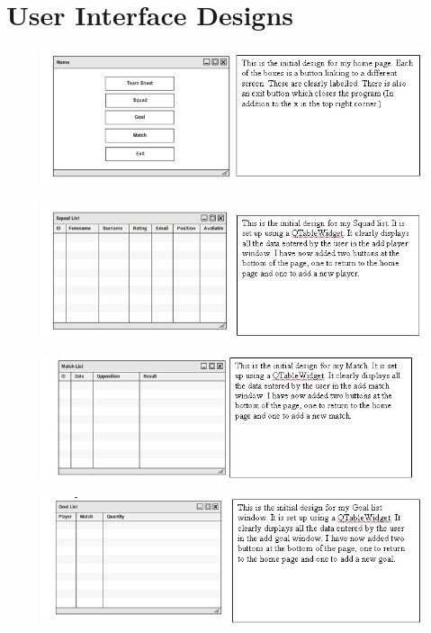 \section{User Interface Designs}
\begin{figure}[H]
	\includegraphics[width=150mm]{HomeUifTxt}
\end{figure}
\begin{figure}[H]
	\includegraphics[width=150mm]{SquadListUifTxt}
\end{figure}
\begin{figure}[H]
	\includegraphics[width=150mm]{MatchListUifTxt}
\end{figure}
\begin{figure}[H]
	\includegraphics[width=150mm]{GoalListUifTxt}
\end{figure}
